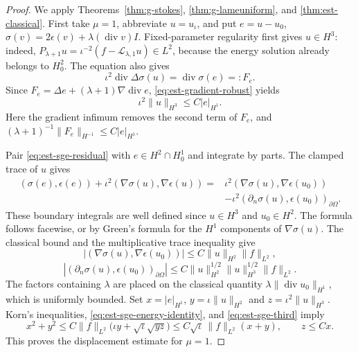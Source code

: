 \documentclass[11pt,a4paper]{article}
\theoremstyle{remark}
\numberwithin{equation}{section}
\begin{document}
\begin{proof}
We apply Theorems~\ref{thm:g-stokes}, \ref{thm:g-lameuniform},
and \ref{thm:est-classical}. First take $\mu=1$, abbreviate
$u=u_\iota$, and put
$e=u-u_0$, $\sigma(v)=2\epsilon(v)+\lambda(\operatorname{div}v)I$.
Fixed-parameter regularity first gives $u\in H^3$: indeed,
$P_{\lambda+1}u=\iota^{-2}(f-\mathcal L_{\lambda,1}u)\in L^2$,
because the energy solution already belongs to $H_0^2$.
The equation also gives
\begin{equation}\label{eq:est-sge-residual}
 \iota^2\operatorname{div}\Delta\sigma(u)
       =\operatorname{div}\sigma(e)=:F_e.
\end{equation}
Since
$F_e=\Delta e+(\lambda+1)\nabla\operatorname{div}e$,
\eqref{eq:est-gradient-robust} yields
\begin{equation}\label{eq:est-sge-third}
 \iota^2\|u\|_{H^3}\le C|e|_{H^1}.
\end{equation}
Here the gradient infimum removes the second term of $F_e$, and
$(\lambda+1)^{-1}\|F_e\|_{H^{-1}}\le C|e|_{H^1}$.

Pair \eqref{eq:est-sge-residual} with $e\in H^2\cap H_0^1$ and
integrate by parts. The clamped trace of $u$ gives
\begin{align}\label{eq:est-sge-energy-identity}
 (\sigma(e),\epsilon(e))
 +\iota^2(\nabla\sigma(u),\nabla\epsilon(u))
 ={}&\iota^2(\nabla\sigma(u),\nabla\epsilon(u_0))\\
 &-\iota^2(\partial_n\sigma(u),\epsilon(u_0))_{\partial\Omega}.
 \nonumber
\end{align}
These boundary integrals are well defined since $u\in H^3$ and
$u_0\in H^2$. The formula follows facewise, or by Green's formula for
the $H^1$ components of $\nabla\sigma(u)$.
The classical bound and the multiplicative trace inequality give
\[
 |(\nabla\sigma(u),\nabla\epsilon(u_0))|
       \le C\|u\|_{H^2}\|f\|_{L^2},
\]
\[
 |(\partial_n\sigma(u),\epsilon(u_0))_{\partial\Omega}|
       \le C\|u\|_{H^2}^{1/2}\|u\|_{H^3}^{1/2}\|f\|_{L^2}.
\]
The factors containing $\lambda$ are placed on the classical quantity
$\lambda\|\operatorname{div}u_0\|_{H^1}$, which is uniformly bounded.
Set $x=|e|_{H^1}$, $y=\iota\|u\|_{H^2}$ and
$z=\iota^2\|u\|_{H^3}$. Korn's inequalities,
\eqref{eq:est-sge-energy-identity}, and
\eqref{eq:est-sge-third} imply
\[
 x^2+y^2\le C\|f\|_{L^2}
       \bigl(\iota y+\sqrt\iota\sqrt{yz}\bigr)
 \le C\sqrt\iota\,\|f\|_{L^2}(x+y),\qquad z\le Cx.
\]
This proves the displacement estimate for $\mu=1$.


\end{proof}
\end{document}
